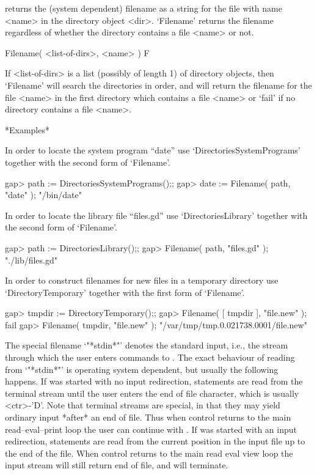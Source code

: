 returns the (system  dependent)  filename as  a string for  the file with
name   <name> in the  directory  object  <dir>.   `Filename' returns  the
filename regardless of  whether the directory contains  a file <name>  or
not.

\>Filename( <list-of-dirs>, <name> ) F

If <list-of-dirs> is a list (possibly  of length 1) of directory objects,
then `Filename' will search the directories in order, and will return the
filename for the file <name> in the first directory which contains a file
<name> or `fail' if no directory contains a file <name>.

*Examples*

In    order  to      locate   the    system   program    ``date''     use
`DirectoriesSystemPrograms' together with the second form of `Filename'.

\begintt
gap> path := DirectoriesSystemPrograms();;
gap> date := Filename( path, "date" );
"/bin/date"
\endtt

In order to locate the library file ``files.gd'' use `DirectoriesLibrary'
together with the second form of `Filename'.

\begintt
gap> path := DirectoriesLibrary();;
gap> Filename( path, "files.gd" );
"./lib/files.gd"
\endtt

In  order to construct filenames for  new  files in a temporary directory
use `DirectoryTemporary' together with the first form of `Filename'.

\begintt
gap> tmpdir := DirectoryTemporary();;
gap> Filename( [ tmpdir ], "file.new" );
fail
gap> Filename( tmpdir, "file.new" );    
"/var/tmp/tmp.0.021738.0001/file.new"
\endtt


The special filename `"*stdin*"'   denotes the standard input, i.e.,  the
stream   through  which the user enters  commands  to  {\GAP}.  The exact
behaviour of reading from `"*stdin*"' is  operating system dependent, but
usually   the  following happens.   If {\GAP} was started with  no  input
redirection, statements are read from  the terminal stream until the user
enters the end of file character, which  is usually <ctr>-'D'.  Note that
terminal streams  are  special, in   that they may  yield ordinary  input
*after* an end of file.
Thus when control returns to the main read--eval--print loop the user can
continue with {\GAP}.
If {\GAP} was started with an input redirection, statements are read from
the current position in  the input file up to the  end of the file.
When control returns to the main read eval view loop the input stream
will still return end of file, and {\GAP} will terminate.

